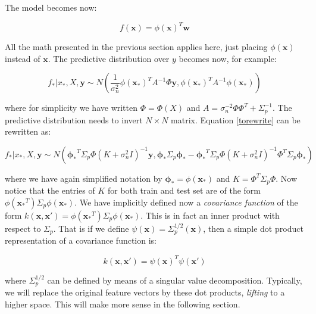 \documentclass[10pt,a4paper,twoside]{book}
\begin{document}
The model becomes now:

\begin{equation}
f(\boldsymbol{x}) = \phi(\boldsymbol{x})^T \boldsymbol{w}
\end{equation}

All the math presented in the previous section applies here, just placing $\phi(\boldsymbol{x})$ instead of $\boldsymbol{x}$. The predictive distribution over $y$ becomes now, for example:

\begin{equation}
\label{torewrite}
f_{*}|x_{*}, X, \boldsymbol{y} \sim N\left( \dfrac{1}{\sigma^2_n}\phi(\boldsymbol{x_*})^T A^{-1}\Phi \boldsymbol{y}, \phi(\boldsymbol{x_*})^T A^{-1}\phi(\boldsymbol{x_*})    \right)
\end{equation}

where for simplicity we have written $\Phi = \Phi(X)$ and $A = \sigma_n^{-2}\Phi\Phi^T + \Sigma_p^{-1}$. The predictive distribution needs to invert $N \times N$ matrix. Equation \ref{torewrite} can be rewritten as:

\begin{equation}
f_{*}|x_{*}, X, \boldsymbol{y} \sim N\left(\boldsymbol{\phi_*}^T\Sigma_p\Phi(K + \sigma^2_n I)^{-1}\boldsymbol{y}, \boldsymbol{\phi_*}\Sigma_p\boldsymbol{\phi_*} - \boldsymbol{\phi_*}^T\Sigma_p\Phi(K + \sigma^2_n I)^{-1}\Phi^T\Sigma_p\boldsymbol{\phi_*}\right)
\end{equation}

where we have again simplified notation by $\boldsymbol{\phi_*} = \phi(\boldsymbol{x_*})$ and $K = \Phi^T\Sigma_p\Phi$. Now notice that the entries of $K$ for both train and test set are of the form  $\phi(\boldsymbol{x_*}^T)\Sigma_p\phi(\boldsymbol{x_*})$. We have implicitly defined now a \textit{covariance function} of the form $k(\boldsymbol{x}, \boldsymbol{x'}) = \phi(\boldsymbol{x_*}^T)\Sigma_p\phi(\boldsymbol{x_*})$. This is in fact an inner product with respect to $\Sigma_p$. That is if we define $\psi(\boldsymbol{x}) = \Sigma_p^{1/2}(\boldsymbol{x})$, then a simple dot product representation of a covariance function is:

\begin{equation}
k(\boldsymbol{x}, \boldsymbol{x'}) = \psi(\boldsymbol{x})^T\psi(\boldsymbol{x'})
\end{equation}

where $\Sigma_p^{1/2}$ can be defined by means of a singular value decomposition. Typically, we will replace the original feature vectors by these dot products, \textit{lifting} to a higher space. This will make more sense in the following section.
\end{document}
